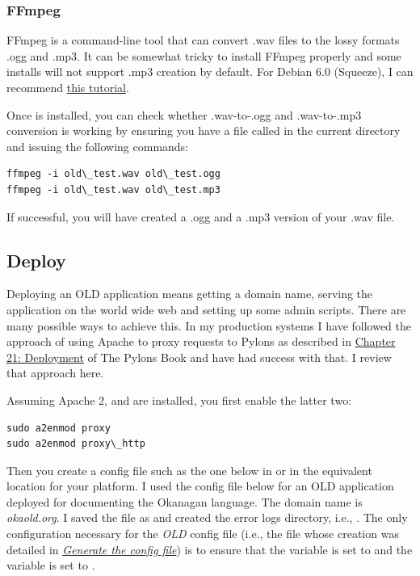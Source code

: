 \documentclass[letterpaper,10pt,english]{sphinxmanual}
\begin{document}
\subsubsection{FFmpeg}
\label{installation:id3}
FFmpeg is a command-line tool that can convert .wav files to the lossy formats
.ogg and .mp3.  It can be somewhat tricky to install FFmpeg properly and some
installs will not support .mp3 creation by default.  For Debian 6.0 (Squeeze), I
can recommend
\href{http://www.e-rave.nl/installing-ffmpeg-on-debian-squeeze-and-newer}{this tutorial}.

Once  is installed, you can check whether .wav-to-.ogg and
.wav-to-.mp3 conversion is working by ensuring you have a file called
 in the current directory and issuing the following commands:

\begin{Verbatim}[commandchars=\\\{\}]
ffmpeg -i old\_test.wav old\_test.ogg
ffmpeg -i old\_test.wav old\_test.mp3
\end{Verbatim}

If successful, you will have created a .ogg and a .mp3 version of your .wav
file.


\subsection{Deploy}
\label{installation:deploy}
Deploying an OLD application means getting a domain name, serving the
application on the world wide web and setting up some admin scripts.  There are
many possible ways to achieve this.  In my production systems I have followed
the approach of using Apache to proxy requests to Pylons as described in
\href{http://pylonsbook.com/en/1.1/deployment.html}{Chapter 21: Deployment} of
The Pylons Book and have had success with that.  I
review that approach here.

Assuming Apache 2,  and  are installed, you
first enable the latter two:

\begin{Verbatim}[commandchars=\\\{\}]
sudo a2enmod proxy
sudo a2enmod proxy\_http
\end{Verbatim}

Then you create a config file such as the one below in
 or in the equivalent location for your
platform.  I used the config file below for an OLD application deployed for
documenting the Okanagan language.  The domain name is \emph{okaold.org}.  I saved
the file as  and  created the error
logs directory, i.e., .  The only configuration necessary for
the \emph{OLD} config file (i.e., the  file whose creation was
detailed in {\hyperref[installation:gen-config]{\emph{Generate the config file}}}) is to ensure that the  variable is set to
 and the  variable is set to .
\end{document}
